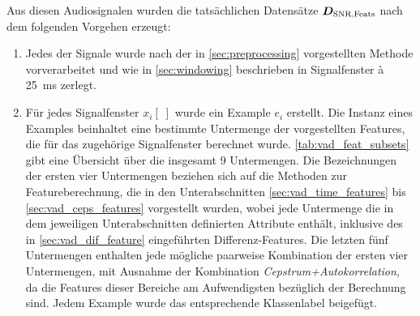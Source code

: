 Aus diesen Audiosignalen wurden die tatsächlichen Datensätze $\boldmath{D_{\text{SNR,Feats}}}$ nach dem folgenden Vorgehen erzeugt:
\begin{enumerate}
\item Jedes der Signale wurde nach der in \autoref{sec:preprocessing} vorgestellten Methode vorverarbeitet und wie in \autoref{sec:windowing} beschrieben in Signalfenster \`{a} \SI{25}{\milli\second} zerlegt.
\item Für jedes Signalfenster $x_i[\;]$ wurde ein Example $e_i$ erstellt. Die Instanz eines Examples beinhaltet eine bestimmte Untermenge der vorgestellten Features, die für das zugehörige Signalfenster berechnet wurde. \autoref{tab:vad_feat_subsets} gibt eine Übersicht über die insgesamt 9 Untermengen. Die Bezeichnungen der ersten vier Untermengen beziehen sich auf die Methoden zur Featureberechnung, die in den Unterabschnitten \ref{sec:vad_time_features} bis \ref{sec:vad_ceps_features} vorgestellt wurden, wobei jede Untermenge die in dem jeweiligen Unterabschnitten definierten Attribute enthält, inklusive des in \autoref{sec:vad_dif_feature} eingeführten Differenz-Features. Die letzten fünf Untermengen enthalten jede mögliche paarweise Kombination der ersten vier Untermengen, mit Ausnahme der Kombination \emph{Cepstrum+Autokorrelation}, da die Features dieser Bereiche am Aufwendigsten bezüglich der Berechnung sind. Jedem Example wurde das entsprechende Klassenlabel beigefügt.


\end{enumerate}
